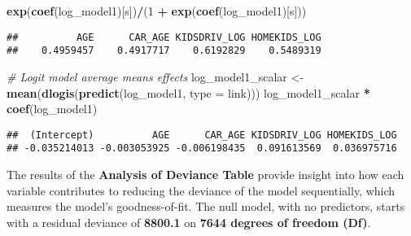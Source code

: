 \documentclass[
]{article}
\newenvironment{Shaded}{\begin{snugshade}}{\end{snugshade}}
\newcommand{\AttributeTok}[1]{\textcolor[rgb]{0.13,0.29,0.53}{#1}}
\newcommand{\CommentTok}[1]{\textcolor[rgb]{0.56,0.35,0.01}{\textit{#1}}}
\newcommand{\DecValTok}[1]{\textcolor[rgb]{0.00,0.00,0.81}{#1}}
\newcommand{\FunctionTok}[1]{\textcolor[rgb]{0.13,0.29,0.53}{\textbf{#1}}}
\newcommand{\NormalTok}[1]{#1}
\newcommand{\OtherTok}[1]{\textcolor[rgb]{0.56,0.35,0.01}{#1}}
\newcommand{\SpecialCharTok}[1]{\textcolor[rgb]{0.81,0.36,0.00}{\textbf{#1}}}
\newcommand{\StringTok}[1]{\textcolor[rgb]{0.31,0.60,0.02}{#1}}
\begin{document}
\begin{Shaded}
\begin{Highlighting}[]
\FunctionTok{exp}\NormalTok{(}\FunctionTok{coef}\NormalTok{(log\_model1)[s])}\SpecialCharTok{/}\NormalTok{(}\DecValTok{1} \SpecialCharTok{+} \FunctionTok{exp}\NormalTok{(}\FunctionTok{coef}\NormalTok{(log\_model1)[s]))}
\end{Highlighting}
\end{Shaded}

\begin{verbatim}
##          AGE      CAR_AGE KIDSDRIV_LOG HOMEKIDS_LOG 
##    0.4959457    0.4917717    0.6192829    0.5489319
\end{verbatim}

\begin{Shaded}
\begin{Highlighting}[]
\CommentTok{\# Logit model average means  effects }
\NormalTok{log\_model1\_scalar  }\OtherTok{\textless{}{-}} \FunctionTok{mean}\NormalTok{(}\FunctionTok{dlogis}\NormalTok{(}\FunctionTok{predict}\NormalTok{(log\_model1, }\AttributeTok{type =} \StringTok{\textquotesingle{}link\textquotesingle{}}\NormalTok{)))}
\NormalTok{log\_model1\_scalar }\SpecialCharTok{*} \FunctionTok{coef}\NormalTok{(log\_model1)}
\end{Highlighting}
\end{Shaded}

\begin{verbatim}
##  (Intercept)          AGE      CAR_AGE KIDSDRIV_LOG HOMEKIDS_LOG 
## -0.035214013 -0.003053925 -0.006198435  0.091613569  0.036975716
\end{verbatim}

The results of the \textbf{Analysis of Deviance Table} provide insight
into how each variable contributes to reducing the deviance of the model
sequentially, which measures the model's goodness-of-fit. The null
model, with no predictors, starts with a residual deviance of
\textbf{8800.1} on \textbf{7644 degrees of freedom (Df)}.
\end{document}
